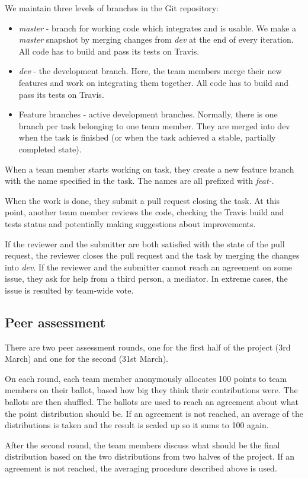 \documentclass[a4paper,12pt]{article}
\begin{document}
We maintain three levels of branches in the Git repository:
\begin{itemize}
    \item{\emph{master} - branch for working code which integrates and is usable. We make a \emph{master} snapshot by merging changes from \emph{dev} at the end of every iteration. All code has to build and pass its tests on Travis.}
    \item{\emph{dev} - the development branch. Here, the team members merge their new features and work on integrating them together. All code has to build and pass its tests on Travis.}
    \item{Feature branches - active development branches. Normally, there is one branch per task belonging to one team member. They are merged into dev when the task is finished (or when the task achieved a stable, partially completed state).}
\end{itemize}

When a team member starts working on task, they create a new feature branch with the name specified in the task. The names are all prefixed with \emph{feat-}. 

When the work is done, they submit a pull request closing the task. At this point, another team member reviews the code, checking the Travis build and tests status and potentially making suggestions about improvements.

If the reviewer and the submitter are both satisfied with the state of the pull request, the reviewer closes the pull request and the task by merging the changes into \emph{dev}. If the reviewer and the submitter cannot reach an agreement on some issue, they ask for help from a third person, a mediator. In extreme cases, the issue is resulted by team-wide vote.

\subsection{Peer assessment}
There are two peer assessment rounds, one for the first half of the project (3rd March) and one for the second (31st March).

On each round, each team member anonymously allocates 100 points to team members on their ballot, based how big they think their contributions were. The ballots are then shuffled. The ballots are used to reach an agreement about what the point distribution should be. If an agreement is not reached, an average of the distributions is taken and the result is scaled up so it sums to 100 again.

After the second round, the team members discuss what should be the final distribution based on the two distributions from two halves of the project. If an agreement is not reached, the averaging procedure described above is used.
\end{document}
